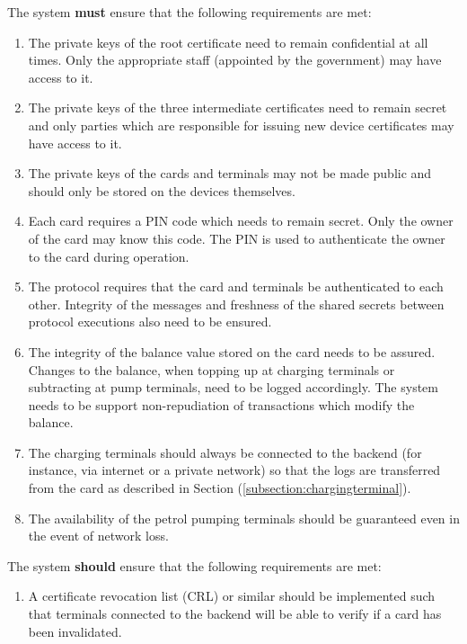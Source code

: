\documentclass[a4paper,10pt]{llncs}
\begin{document}
The system {\bf must} ensure that the following requirements are met:
\begin{enumerate}
  \item The private keys of the root certificate need to remain confidential at all times. Only the appropriate staff (appointed by the government) may have access to it.
  \item The private keys of the three intermediate certificates need to remain secret and only parties which are responsible for issuing new device certificates may have access to it.
  \item The private keys of the cards and terminals may not be made public and should only be stored on the devices themselves.
  \item Each card requires a PIN code which needs to remain secret. Only the owner of the card may know this code. The PIN is used to authenticate the owner to the card during operation.
  \item The protocol requires that the card and terminals be authenticated to each other. Integrity of the messages and freshness of the shared secrets between protocol executions also need to be ensured.
  \item The integrity of the balance value stored on the card needs to be assured. Changes to the balance, when topping up at charging terminals or subtracting at pump terminals, need to be logged accordingly. The system needs to be support non-repudiation of transactions which modify the balance.
  \item The charging terminals should always be connected to the backend (for instance, via internet or a private network) so that the logs are transferred from the card as described in Section (\ref{subsection:chargingterminal}).
  \item The availability of the petrol pumping terminals should be guaranteed even in the event of network loss.

\end{enumerate}

The system {\bf should} ensure that the following requirements are met:
\begin{enumerate}
  \item A certificate revocation list (CRL) or similar should be implemented such that terminals connected to the backend will be able to verify if a card has been invalidated.
\end{enumerate}
\end{document}
